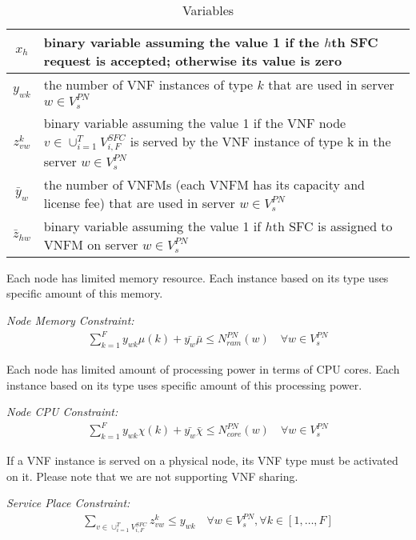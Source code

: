 \begin{table}[H]
    \caption{Variables}
    \label{tbl:variables-1}
    \begin{center}\begin{tabular}{|c|p{}|}
    \hline
    \(x_h\) & binary variable assuming the value 1 if the \(h\)th SFC request is accepted; otherwise its value is zero \\
    \hline
    \(y_{wk}\) & the number of VNF instances of type \(k\) that are used in server \(w \in V_s^{PN}\) \\
    \hline
    \(z^k_{vw}\) & binary variable assuming the value 1 if the VNF node \(v \in \cup_{i=1}^{T} V_{i, F}^{SFC}\) is served by the VNF instance of type k in the server \(w \in V_s^{PN}\) \\
    \hline
    \(\bar{y}_w\) & the number of VNFMs (each VNFM has its capacity and license fee) that are used in server \(w \in V_s^{PN} \) \\
    \hline
    \(\bar{z}_{hw}\) & binary variable assuming the value 1 if \(h\)th SFC is assigned to VNFM on server \(w \in V_s^{PN}\) \\
    \hline
    \end{tabular}\end{center}
\end{table}

Each node has limited memory resource. Each instance based on its type uses specific amount of this memory.

\textit{Node Memory Constraint:}
\begin{align}
    \sum_{k=1}^F y_{wk} \mu(k) + \bar{y_w} \bar\mu \le N_{ram}^{PN}(w)
    \quad
    \forall w \in V_s^{PN}
\end{align}

Each node has limited amount of processing power in terms of CPU cores. Each instance based on its type uses
specific amount of this processing power.

\textit{Node CPU Constraint:}
\begin{align}
    \sum_{k=1}^F y_{wk} \chi(k) + \bar{y_w} \bar\chi \le N_{core}^{PN}(w)
    \quad
    \forall w \in V_s^{PN}
\end{align}

If a VNF instance is served on a physical node, its VNF type must be activated on it.
Please note that we are not supporting VNF sharing.

\textit{Service Place Constraint:}
\begin{align}
    \sum_{v \in \cup_{i=1}^T V_{i, F}^{SFC}} z_{vw}^k \le y_{wk}
    \quad
    \forall w \in V_s^{PN}, \forall k \in [1,\ldots, F]
\end{align}

